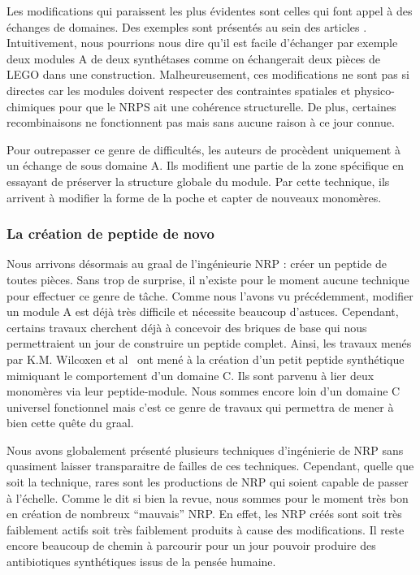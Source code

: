 Les modifications qui paraissent les plus évidentes sont celles qui font appel à des échanges de domaines.
Des exemples sont présentés au sein des articles \cite{cane_harnessing_1998,kim_reinvigorating_2015}.
Intuitivement, nous pourrions nous dire qu'il est facile d'échanger par exemple deux modules A de deux synthétases comme on échangerait deux pièces de LEGO dans une construction.
Malheureusement, ces modifications ne sont pas si directes car les modules doivent respecter des contraintes spatiales et physico-chimiques pour que le NRPS ait une cohérence structurelle.
De plus, certaines recombinaisons ne fonctionnent pas mais sans aucune raison à ce jour connue.


Pour outrepasser ce genre de difficultés, les auteurs de \cite{kries_subdomain_2015} procèdent uniquement à un échange de sous domaine A.
Ils modifient une partie de la zone spécifique en essayant de préserver la structure globale du module.
Par cette technique, ils arrivent à modifier la forme de la poche et capter de nouveaux monomères.


\subsubsection{La création de peptide de novo}

Nous arrivons désormais au graal de l'ingénieurie NRP : créer un peptide de toutes pièces.
Sans trop de surprise, il n'existe pour le moment aucune technique pour effectuer ce genre de tâche.
Comme nous l'avons vu précédemment, modifier un module A est déjà très difficile et nécessite beaucoup d'astuces.
Cependant, certains travaux cherchent déjà à concevoir des briques de base qui nous permettraient un jour de construire un peptide complet.
Ainsi, les travaux menés par K.M. Wilcoxen et al~\cite{wilcoxen_biomimetic_2007} ont mené à la création d'un petit peptide synthétique mimiquant le comportement d'un domaine C.
Ils sont parvenu à lier deux monomères via leur peptide-module.
Nous sommes encore loin d'un domaine C universel fonctionnel mais c'est ce genre de travaux qui permettra de mener à bien cette quête du graal.


Nous avons globalement présenté plusieurs techniques d'ingénierie de NRP sans quasiment laisser transparaitre de failles de ces techniques.
Cependant, quelle que soit la technique, rares sont les productions de NRP qui soient capable de passer à l'échelle.
Comme le dit si bien la revue, nous sommes pour le moment très bon en création de nombreux ``mauvais'' NRP.
En effet, les NRP créés sont soit très faiblement actifs soit très faiblement produits à cause des modifications.
Il reste encore beaucoup de chemin à parcourir pour un jour pouvoir produire des antibiotiques synthétiques issus de la pensée humaine.



